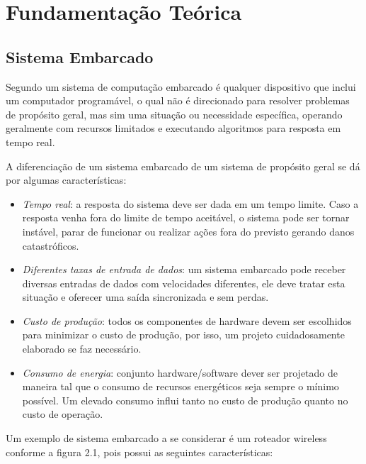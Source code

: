 ﻿\chapter{Fundamenta\c{c}\~{a}o Te\'{o}rica}
\label{cap:fundamentacao teorica}


\section{Sistema Embarcado}

Segundo \textcite{Wolf:2001} um sistema de computação embarcado é qualquer dispositivo que inclui um computador programável, o qual não é direcionado para resolver problemas de propósito geral, mas sim uma situação ou necessidade específica, operando geralmente com recursos limitados e executando algoritmos para resposta em tempo real.

A diferenciação de um sistema embarcado de um sistema de propósito geral se dá por algumas características:
\begin{itemize}
	\item \emph{Tempo real}: a resposta do sistema deve ser dada em um tempo limite. Caso a resposta venha fora do limite de tempo aceitável, o sistema pode ser tornar instável, parar de funcionar ou realizar ações fora do previsto gerando danos catastróficos. 
	\item \emph{Diferentes taxas de entrada de dados}: um sistema embarcado pode receber diversas entradas de dados com velocidades diferentes, ele deve tratar esta situação e oferecer uma saída sincronizada e sem perdas.
	\item \emph{Custo de produção}: todos os componentes de hardware devem ser escolhidos para minimizar o custo de produção, por isso, um projeto cuidadosamente elaborado se faz necessário.
	\item \emph{Consumo de energia}: conjunto hardware/software dever ser projetado de maneira tal que o consumo de recursos energéticos seja sempre o mínimo possível. Um elevado consumo influi tanto no custo de produção  quanto no custo de operação.
\end{itemize}

Um exemplo de sistema embarcado a se considerar é um roteador wireless conforme a figura 2.1, pois possui as seguintes características:

